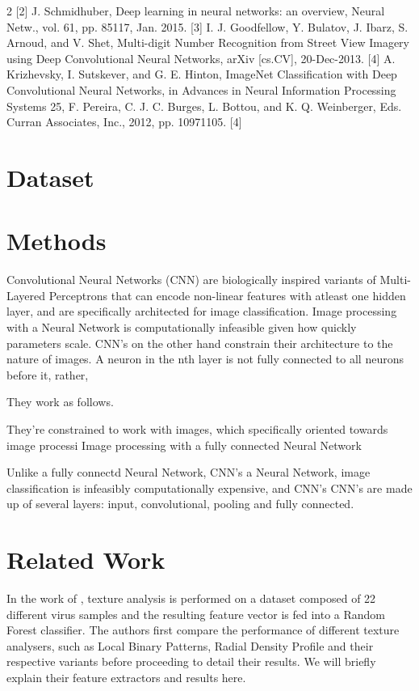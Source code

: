 \begin{multicols}{2}
[2] J. Schmidhuber, Deep learning in neural networks: an overview, Neural Netw., vol. 61, pp. 85117, Jan. 2015.
[3] I. J. Goodfellow, Y. Bulatov, J. Ibarz, S. Arnoud, and V. Shet, Multi-digit Number Recognition from Street View Imagery using Deep Convolutional Neural Networks, arXiv [cs.CV], 20-Dec-2013.
[4] A. Krizhevsky, I. Sutskever, and G. E. Hinton, ImageNet Classification with Deep Convolutional Neural Networks, in Advances in Neural Information Processing Systems 25, F. Pereira, C. J. C. Burges, L. Bottou, and K. Q. Weinberger, Eds. Curran Associates, Inc., 2012, pp. 10971105.
[4] 

\section{Dataset}
\label{text:dataset}


\section{Methods}
Convolutional Neural Networks (CNN) are biologically inspired variants of Multi-Layered Perceptrons that can encode non-linear features with atleast one hidden layer, and are specifically architected for image classification. Image processing with a Neural Network is computationally infeasible given how quickly parameters scale. CNN's on the other hand constrain their architecture to the nature of images. A neuron in the nth layer is not fully connected to all neurons before it, rather, 


They work as follows. 

 They're constrained to work with images, which specifically oriented towards image processi Image processing with a fully connected Neural Network 

Unlike a fully connectd Neural Network, CNN's  a Neural Network, image classification is infeasibly computationally expensive, and CNN's  CNN's are made up of several layers: input, convolutional, pooling and fully connected.  

\section{Related Work}
In the work of \citet{kylberg2011virus}, texture analysis is performed on a dataset composed of 22 different  virus samples and the resulting feature vector is fed into a Random Forest classifier. The authors first compare the performance of different texture analysers, such as Local Binary Patterns, Radial Density Profile and their respective variants before proceeding to detail their results. We will briefly explain their feature extractors and results here. 

\end{multicols}
